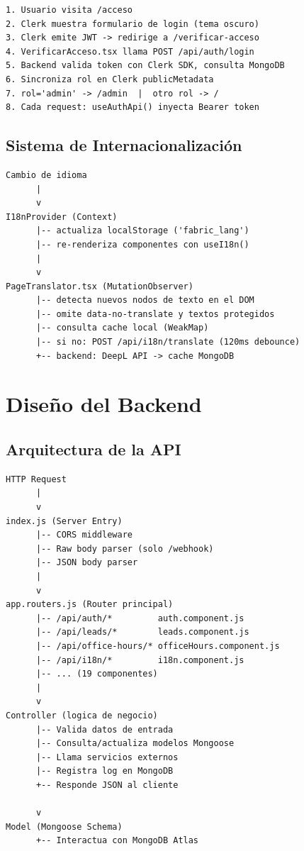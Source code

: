 \documentclass[12pt, a4paper, twoside]{report}
\begin{document}
\begin{tcolorbox}[codebox]
\begin{verbatim}
1. Usuario visita /acceso
2. Clerk muestra formulario de login (tema oscuro)
3. Clerk emite JWT -> redirige a /verificar-acceso
4. VerificarAcceso.tsx llama POST /api/auth/login
5. Backend valida token con Clerk SDK, consulta MongoDB
6. Sincroniza rol en Clerk publicMetadata
7. rol='admin' -> /admin  |  otro rol -> /
8. Cada request: useAuthApi() inyecta Bearer token
\end{verbatim}
\end{tcolorbox}

\subsection{Sistema de Internacionalización}

\begin{tcolorbox}[codebox]
\begin{verbatim}
Cambio de idioma
      |
      v
I18nProvider (Context)
      |-- actualiza localStorage ('fabric_lang')
      |-- re-renderiza componentes con useI18n()
      |
      v
PageTranslator.tsx (MutationObserver)
      |-- detecta nuevos nodos de texto en el DOM
      |-- omite data-no-translate y textos protegidos
      |-- consulta cache local (WeakMap)
      |-- si no: POST /api/i18n/translate (120ms debounce)
      +-- backend: DeepL API -> cache MongoDB
\end{verbatim}
\end{tcolorbox}

\section{Diseño del Backend}

\subsection{Arquitectura de la API}

\begin{tcolorbox}[codebox]
\begin{verbatim}
HTTP Request
      |
      v
index.js (Server Entry)
      |-- CORS middleware
      |-- Raw body parser (solo /webhook)
      |-- JSON body parser
      |
      v
app.routers.js (Router principal)
      |-- /api/auth/*         auth.component.js
      |-- /api/leads/*        leads.component.js
      |-- /api/office-hours/* officeHours.component.js
      |-- /api/i18n/*         i18n.component.js
      |-- ... (19 componentes)
      |
      v
Controller (logica de negocio)
      |-- Valida datos de entrada
      |-- Consulta/actualiza modelos Mongoose
      |-- Llama servicios externos
      |-- Registra log en MongoDB
      +-- Responde JSON al cliente

      v
Model (Mongoose Schema)
      +-- Interactua con MongoDB Atlas
\end{verbatim}
\end{tcolorbox}
\end{document}
